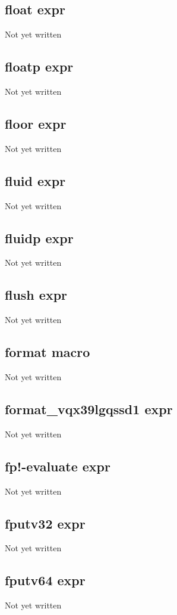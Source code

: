 \documentclass[a4paper,11pt]{article}
\begin{document}
\subsection{\ttfamily float expr}
Not yet written

\subsection{\ttfamily floatp expr}
Not yet written

\subsection{\ttfamily floor expr}
Not yet written

\subsection{\ttfamily fluid expr}
Not yet written

\subsection{\ttfamily fluidp expr}
Not yet written

\subsection{\ttfamily flush expr}
Not yet written

\subsection{\ttfamily format macro}
Not yet written

\subsection{\ttfamily format\_vqx39lgqssd1 expr}
Not yet written

\subsection{\ttfamily fp!-evaluate expr}
Not yet written

\subsection{\ttfamily fputv32 expr}
Not yet written

\subsection{\ttfamily fputv64 expr}
Not yet written
\end{document}
